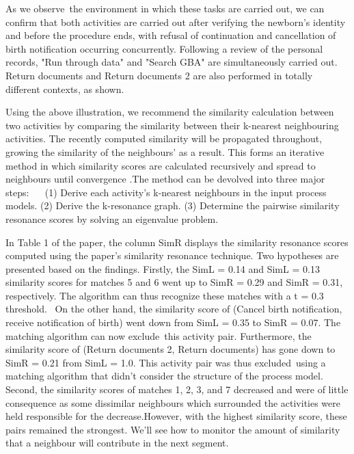 \documentclass[runningheads]{llncs}
\begin{document}
As we observe the environment in which these tasks are carried out, we can confirm that both activities are carried out after verifying the newborn's identity and before the procedure ends, with refusal of continuation and cancellation of birth notification occurring concurrently. Following a review of the personal records, "Run through data" and "Search GBA" are simultaneously carried out. Return documents and Return documents 2 are also performed in totally different contexts, as shown.\newline 

Using the above illustration, we recommend the similarity calculation between two activities by comparing the similarity between their k-nearest neighbouring activities. The recently computed similarity will be propagated throughout, growing the similarity of the neighbours' as a result. This forms an iterative method in which similarity scores are calculated recursively and spread to neighbours until convergence\cite{ref18} .The method can be devolved into three major steps: 
\newline 
(1) Derive each activity’s k-nearest neighbours in the input process models.
(2) Derive the k-resonance graph.
(3) Determine the pairwise similarity resonance scores by solving an eigenvalue problem.\newline 


In Table 1 of the paper, the column SimR displays the similarity resonance scores computed using the paper's similarity resonance technique. Two hypotheses are presented based on the findings. Firstly, the SimL = 0.14 and SimL = 0.13 similarity scores for matches 5 and 6 went up to SimR = 0.29 and SimR = 0.31, respectively. The algorithm can thus recognize these matches with a t = 0.3 threshold.  On the other hand, the similarity score of (Cancel birth notification, receive notification of birth) went down from SimL = 0.35 to SimR = 0.07. The matching algorithm can now exclude this activity pair. Furthermore, the similarity score of (Return documents 2, Return documents) has gone down to SimR = 0.21 from SimL = 1.0. This activity pair was thus excluded using a matching algorithm that didn’t consider the structure of the process model. Second, the similarity scores of matches 1, 2, 3, and 7 decreased and were of little consequence as some dissimilar neighbours which surrounded the activities were held responsible for the decrease\cite{ref12}.However, with the highest similarity score, these pairs remained the strongest. We'll see how to monitor the amount of similarity that a neighbour will contribute in the next segment.
\end{document}
